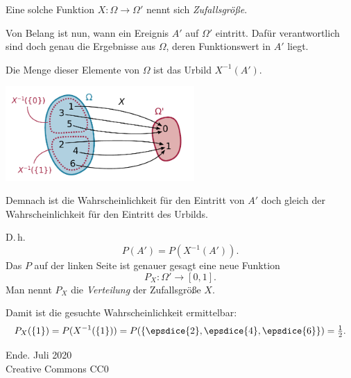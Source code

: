 \documentclass[9pt]{beamer}
\newcommand{\modest}[1]{{\small\color{gray}#1}}
\newcommand{\parspace}{\vspace{0.8em}}
\newcommand\dice[1]{\vcenter{\hbox{\epsdice{#1}}}}
\begin{document}
\begin{frame}[t]
\vspace{3em}
Eine solche Funktion $X\colon\Omega\to\Omega'$ nennt sich
\emph{Zufallsgröße}.\pause

\parspace
Von Belang ist nun, wann ein Ereignis $A'$ auf $\Omega'$ eintritt.
Dafür verantwortlich sind doch genau die Ergebnisse aus $\Omega$,
deren Funktionswert in $A'$ liegt.\pause

\parspace
Die Menge dieser Elemente von $\Omega$ ist das Urbild $X^{-1}(A')$.\pause

\begin{center}
\includegraphics[width=72mm]{img/preimage.pdf}
\end{center}
\end{frame}

\begin{frame}
Demnach ist die Wahrscheinlichkeit für den Eintritt von $A'$ doch
gleich der Wahrscheinlichkeit für den Eintritt des Urbilds.\pause

\parspace
D.\,h.
\[P(A') = P(X^{-1}(A')).\]\pause
Das $P$ auf der linken Seite ist genauer gesagt eine neue Funktion
\[P_X\colon\Omega'\to [0,1].\]\pause
Man nennt $P_X$ die \emph{Verteilung} der Zufallsgröße $X$.
\end{frame}

\begin{frame}
Damit ist die gesuchte Wahrscheinlichkeit ermittelbar:
\[P_X(\{1\}) = P(X^{-1}(\{1\})) = P(\{\dice{2},\dice{4},\dice{6}\})
 = \tfrac{1}{2}.\]
\end{frame}

\begin{frame}
Ende.
\vfill\hfill\modest{Juli 2020}\\
\hfill\modest{Creative Commons CC0}
\end{frame}
\end{document}
